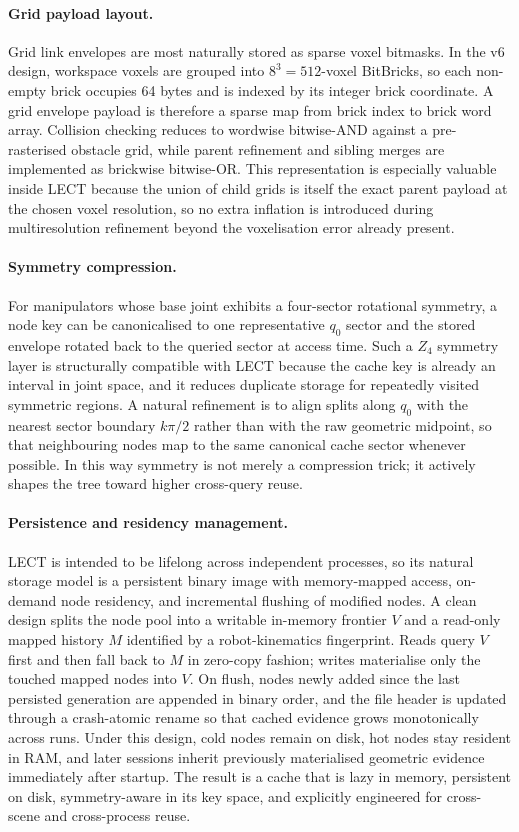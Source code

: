 \documentclass[journal]{IEEEtran}
\begin{document}
\paragraph{Grid payload layout.}
Grid link envelopes are most naturally stored as sparse voxel bitmasks. In the
v6 design, workspace voxels are grouped into $8^3=512$-voxel BitBricks, so
each non-empty brick occupies 64 bytes and is indexed by its integer brick
coordinate. A grid envelope payload is therefore a sparse map from brick index
to brick word array. Collision checking reduces to wordwise bitwise-AND against
a pre-rasterised obstacle grid, while parent refinement and sibling merges are
implemented as brickwise bitwise-OR. This representation is especially valuable
inside LECT because the union of child grids is itself the exact parent payload
at the chosen voxel resolution, so no extra inflation is introduced during
multiresolution refinement beyond the voxelisation error already present.

\paragraph{Symmetry compression.}
For manipulators whose base joint exhibits a four-sector rotational symmetry, a
node key can be canonicalised to one representative $q_0$ sector and the stored
envelope rotated back to the queried sector at access time. Such a $Z_4$
symmetry layer is structurally compatible with LECT because the cache key is
already an interval in joint space, and it reduces duplicate storage for
repeatedly visited symmetric regions. A natural refinement is to align splits
along $q_0$ with the nearest sector boundary $k\pi/2$ rather than with the raw
geometric midpoint, so that neighbouring nodes map to the same canonical cache
sector whenever possible. In this way symmetry is not merely a compression
trick; it actively shapes the tree toward higher cross-query reuse.

\paragraph{Persistence and residency management.}
LECT is intended to be lifelong across independent processes, so its natural
storage model is a persistent binary image with memory-mapped access,
on-demand node residency, and incremental flushing of modified nodes. A clean
design splits the node pool into a writable in-memory frontier $V$ and a
read-only mapped history $M$ identified by a robot-kinematics fingerprint.
Reads query $V$ first and then fall back to $M$ in zero-copy fashion; writes
materialise only the touched mapped nodes into $V$. On flush, nodes newly added
since the last persisted generation are appended in binary order, and the file
header is updated through a crash-atomic rename so that cached evidence grows
monotonically across runs. Under this design, cold nodes remain on disk, hot
nodes stay resident in RAM, and later sessions inherit previously materialised
geometric evidence immediately after startup. The result is a cache that is
lazy in memory, persistent on disk, symmetry-aware in its key space, and
explicitly engineered for cross-scene and cross-process reuse.
\end{document}
